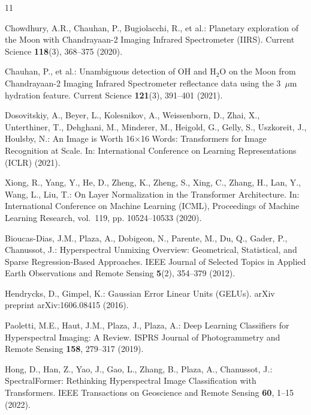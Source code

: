 \documentclass[runningheads]{llncs}
\begin{document}
\begin{thebibliography}{11}

Chowdhury, A.R., Chauhan, P., Bugiolacchi, R., et al.:
Planetary exploration of the Moon with Chandrayaan-2 Imaging Infrared Spectrometer (IIRS).
Current Science \textbf{118}(3), 368--375 (2020).

Chauhan, P., et al.:
Unambiguous detection of OH and H$_2$O on the Moon from Chandrayaan-2 Imaging Infrared Spectrometer reflectance data using the 3~$\mu$m hydration feature.
Current Science \textbf{121}(3), 391--401 (2021).

Dosovitskiy, A., Beyer, L., Kolesnikov, A., Weissenborn, D., Zhai, X.,
Unterthiner, T., Dehghani, M., Minderer, M., Heigold, G., Gelly, S.,
Uszkoreit, J., Houlsby, N.:
An Image is Worth 16$\times$16 Words: Transformers for Image Recognition at Scale.
In: International Conference on Learning Representations (ICLR) (2021).

Xiong, R., Yang, Y., He, D., Zheng, K., Zheng, S., Xing, C.,
Zhang, H., Lan, Y., Wang, L., Liu, T.:
On Layer Normalization in the Transformer Architecture.
In: International Conference on Machine Learning (ICML),
Proceedings of Machine Learning Research, vol.~119,
pp. 10524--10533 (2020).

Bioucas-Dias, J.M., Plaza, A., Dobigeon, N., Parente, M., Du, Q.,
Gader, P., Chanussot, J.:
Hyperspectral Unmixing Overview: Geometrical, Statistical, and Sparse Regression-Based Approaches.
IEEE Journal of Selected Topics in Applied Earth Observations and Remote Sensing
\textbf{5}(2), 354--379 (2012).

Hendrycks, D., Gimpel, K.:
Gaussian Error Linear Units (GELUs).
arXiv preprint arXiv:1606.08415 (2016).

Paoletti, M.E., Haut, J.M., Plaza, J., Plaza, A.:
Deep Learning Classifiers for Hyperspectral Imaging: A Review.
ISPRS Journal of Photogrammetry and Remote Sensing
\textbf{158}, 279--317 (2019).

Hong, D., Han, Z., Yao, J., Gao, L., Zhang, B., Plaza, A.,
Chanussot, J.:
SpectralFormer: Rethinking Hyperspectral Image Classification with Transformers.
IEEE Transactions on Geoscience and Remote Sensing
\textbf{60}, 1--15 (2022).


\end{thebibliography}
\end{document}
